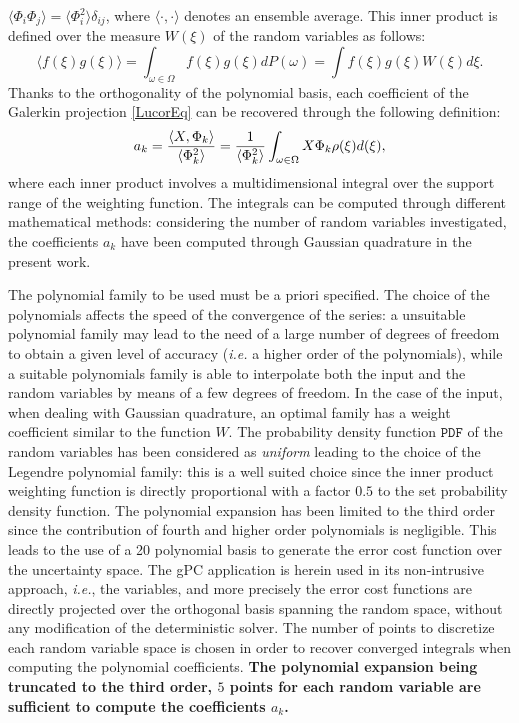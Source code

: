 \documentclass[conf]{new-aiaa}
\begin{document}
%
$\langle\Phi_i \Phi_j\rangle=\langle\Phi_i^2\rangle \delta_{ij}$,
%
where $\langle\cdot,\cdot\rangle$ denotes an ensemble average.
%
This inner product is defined over the measure $W(\xi)$ of the random variables as follows:
%
\begin{equation}
\langle f(\xi)g(\xi)\rangle= \int_{\omega \in \Omega} f(\xi)g(\xi)dP(\omega)= \int f(\xi)g(\xi) W(\xi) d \xi.
\end{equation}
%
Thanks to the orthogonality of the polynomial basis, each coefficient of the Galerkin projection \eqref{LucorEq} can be recovered through the following definition:
%
\begin{equation}
a_k = \frac{\langle X,\Phi_k\rangle }{\langle \Phi_{k}^2\rangle}= \frac{1}{\langle \Phi_{k}^2\rangle}\int_{\omega \in \Omega} X \Phi_k \rho({\bf \xi}) d({\bf \xi}),
\end{equation}
%
where each inner product involves a multidimensional integral over the support range of the weighting function.
%
The integrals can be computed through different mathematical methods: considering the number of random variables investigated, the coefficients $a_k$ have been computed through Gaussian quadrature in the present work.

The polynomial family to be used must be a priori specified. The choice of the polynomials affects the speed of the convergence of the series: a unsuitable polynomial family may lead to the need of a large number of degrees of freedom to obtain a given level of accuracy (\textit{i.e.} a higher order of the polynomials), while a suitable polynomials family is able to interpolate both the input and the random variables by means of a few degrees of freedom.
%
In the case of the input, when dealing with Gaussian quadrature, an optimal family has a weight coefficient similar to the function $W$.
%
The probability density function $\texttt{PDF}$ of the random variables has been considered as \textit{uniform} leading to the choice of the Legendre polynomial family: this is a well suited choice since the inner product weighting function is directly proportional with a factor $0.5$ to the set probability density function.
%
The polynomial expansion has been limited to the third order since the contribution of fourth and higher order polynomials is negligible.
%
This leads to the use of a 20 polynomial basis to generate the error cost function over the uncertainty space. 
%
The gPC application is herein used in its non-intrusive approach, \textit{i.e.}, the variables, and more precisely the error cost functions are directly projected over the orthogonal basis spanning the random space, without any modification of the deterministic solver. 
%
The number of points to discretize each random variable space is chosen in order to recover converged integrals when computing the polynomial coefficients.
%
\textbf{The polynomial expansion being truncated to the third order, $5$ points for each random variable are sufficient to compute the coefficients $a_k$.}
%
\end{document}
